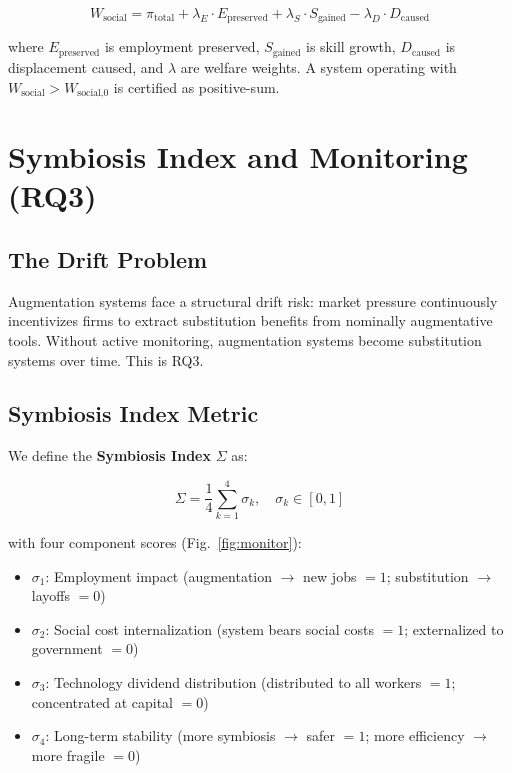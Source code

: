 \documentclass[conference]{IEEEtran}
\begin{document}
\begin{equation}
  W_{\text{social}} = \pi_{\text{total}}
    + \lambda_E \cdot E_{\text{preserved}}
    + \lambda_S \cdot S_{\text{gained}}
    - \lambda_D \cdot D_{\text{caused}}
  \label{eq:welfare}
\end{equation}

where $E_{\text{preserved}}$ is employment preserved,
$S_{\text{gained}}$ is skill growth, $D_{\text{caused}}$
is displacement caused, and $\lambda$ are welfare weights.
A system operating with $W_{\text{social}} > W_{\text{social,0}}$
is certified as positive-sum.

\section{Symbiosis Index and Monitoring (RQ3)}

\subsection{The Drift Problem}

Augmentation systems face a structural drift risk:
market pressure continuously incentivizes firms to
extract substitution benefits from nominally augmentative
tools. Without active monitoring, augmentation systems
become substitution systems over time. This is RQ3.

\subsection{Symbiosis Index Metric}

We define the \textbf{Symbiosis Index} $\Sigma$ as:

\begin{equation}
  \Sigma = \frac{1}{4} \sum_{k=1}^{4} \sigma_k,
  \quad \sigma_k \in [0,1]
  \label{eq:symbiosis}
\end{equation}

with four component scores (Fig.~\ref{fig:monitor}):

\begin{itemize}
  \item $\sigma_1$: Employment impact
        (augmentation $\to$ new jobs $= 1$;
        substitution $\to$ layoffs $= 0$)
  \item $\sigma_2$: Social cost internalization
        (system bears social costs $= 1$;
        externalized to government $= 0$)
  \item $\sigma_3$: Technology dividend distribution
        (distributed to all workers $= 1$;
        concentrated at capital $= 0$)
  \item $\sigma_4$: Long-term stability
        (more symbiosis $\to$ safer $= 1$;
        more efficiency $\to$ more fragile $= 0$)
\end{itemize}
\end{document}
